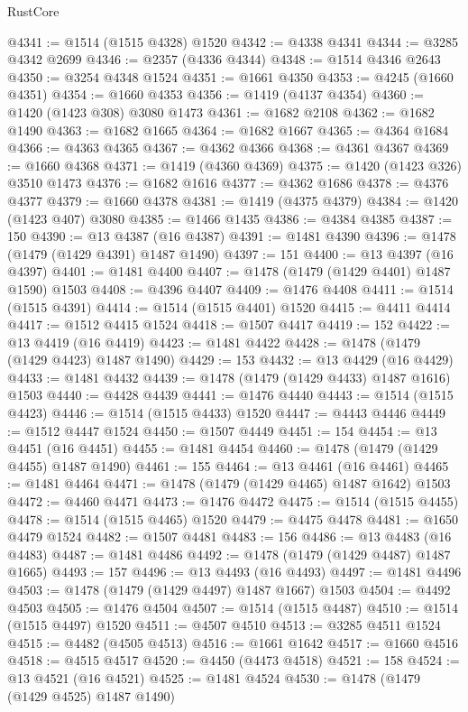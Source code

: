 \begin{lexlean}{RustCore}
\begin{coremodule}
@4341 := @1514 (@1515 @4328) @1520
@4342 := @4338 @4341
@4344 := @3285 @4342 @2699
@4346 := @2357 (@4336 @4344)
@4348 := @1514 @4346 @2643
@4350 := @3254 @4348 @1524
@4351 := @1661 @4350
@4353 := @4245 (@1660 @4351)
@4354 := @1660 @4353
@4356 := @1419 (@4137 @4354)
@4360 := @1420 (@1423 @308) @3080 @1473
@4361 := @1682 @2108
@4362 := @1682 @1490
@4363 := @1682 @1665
@4364 := @1682 @1667
@4365 := @4364 @1684
@4366 := @4363 @4365
@4367 := @4362 @4366
@4368 := @4361 @4367
@4369 := @1660 @4368
@4371 := @1419 (@4360 @4369)
@4375 := @1420 (@1423 @326) @3510 @1473
@4376 := @1682 @1616
@4377 := @4362 @1686
@4378 := @4376 @4377
@4379 := @1660 @4378
@4381 := @1419 (@4375 @4379)
@4384 := @1420 (@1423 @407) @3080
@4385 := @1466 @1435
@4386 := @4384 @4385
@4387 := 150
@4390 := @13 @4387 (@16 @4387)
@4391 := @1481 @4390
@4396 := @1478 (@1479 (@1429 @4391) @1487 @1490)
@4397 := 151
@4400 := @13 @4397 (@16 @4397)
@4401 := @1481 @4400
@4407 := @1478 (@1479 (@1429 @4401) @1487 @1590) @1503
@4408 := @4396 @4407
@4409 := @1476 @4408
@4411 := @1514 (@1515 @4391)
@4414 := @1514 (@1515 @4401) @1520
@4415 := @4411 @4414
@4417 := @1512 @4415 @1524
@4418 := @1507 @4417
@4419 := 152
@4422 := @13 @4419 (@16 @4419)
@4423 := @1481 @4422
@4428 := @1478 (@1479 (@1429 @4423) @1487 @1490)
@4429 := 153
@4432 := @13 @4429 (@16 @4429)
@4433 := @1481 @4432
@4439 := @1478 (@1479 (@1429 @4433) @1487 @1616) @1503
@4440 := @4428 @4439
@4441 := @1476 @4440
@4443 := @1514 (@1515 @4423)
@4446 := @1514 (@1515 @4433) @1520
@4447 := @4443 @4446
@4449 := @1512 @4447 @1524
@4450 := @1507 @4449
@4451 := 154
@4454 := @13 @4451 (@16 @4451)
@4455 := @1481 @4454
@4460 := @1478 (@1479 (@1429 @4455) @1487 @1490)
@4461 := 155
@4464 := @13 @4461 (@16 @4461)
@4465 := @1481 @4464
@4471 := @1478 (@1479 (@1429 @4465) @1487 @1642) @1503
@4472 := @4460 @4471
@4473 := @1476 @4472
@4475 := @1514 (@1515 @4455)
@4478 := @1514 (@1515 @4465) @1520
@4479 := @4475 @4478
@4481 := @1650 @4479 @1524
@4482 := @1507 @4481
@4483 := 156
@4486 := @13 @4483 (@16 @4483)
@4487 := @1481 @4486
@4492 := @1478 (@1479 (@1429 @4487) @1487 @1665)
@4493 := 157
@4496 := @13 @4493 (@16 @4493)
@4497 := @1481 @4496
@4503 := @1478 (@1479 (@1429 @4497) @1487 @1667) @1503
@4504 := @4492 @4503
@4505 := @1476 @4504
@4507 := @1514 (@1515 @4487)
@4510 := @1514 (@1515 @4497) @1520
@4511 := @4507 @4510
@4513 := @3285 @4511 @1524
@4515 := @4482 (@4505 @4513)
@4516 := @1661 @1642
@4517 := @1660 @4516
@4518 := @4515 @4517
@4520 := @4450 (@4473 @4518)
@4521 := 158
@4524 := @13 @4521 (@16 @4521)
@4525 := @1481 @4524
@4530 := @1478 (@1479 (@1429 @4525) @1487 @1490)

\end{coremodule}
\end{lexlean}
